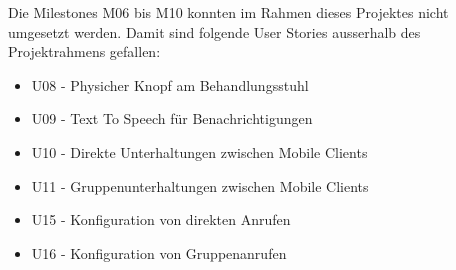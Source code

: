 Die Milestones M06 bis M10 konnten im Rahmen dieses Projektes nicht umgesetzt werden.
Damit sind folgende User Stories ausserhalb des Projektrahmens gefallen:

\begin{itemize}
    \item U08 - Physicher Knopf am Behandlungsstuhl
    \item U09 - Text To Speech für Benachrichtigungen
    \item U10 - Direkte Unterhaltungen zwischen Mobile Clients
    \item U11 - Gruppenunterhaltungen zwischen Mobile Clients
    \item U15 - Konfiguration von direkten Anrufen
    \item U16 - Konfiguration von Gruppenanrufen
\end{itemize}
